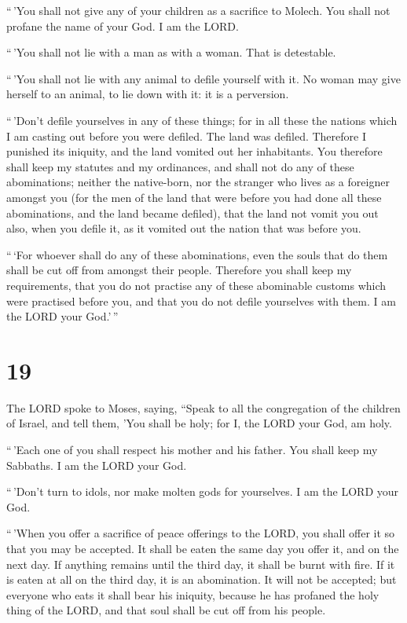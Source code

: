  ``\,'You shall not give any of your children as a
sacrifice to Molech. You shall not profane the name of your God. I am
the LORD.

 ``\,'You shall not lie with a man as with a woman. That is
detestable.

 ``\,'You shall not lie with any animal to defile yourself
with it. No woman may give herself to an animal, to lie down with it: it
is a perversion.

 ``\,'Don't defile yourselves in any of these things; for
in all these the nations which I am casting out before you were defiled.
 The land was defiled. Therefore I punished its iniquity,
and the land vomited out her inhabitants.  You therefore
shall keep my statutes and my ordinances, and shall not do any of these
abominations; neither the native-born, nor the stranger who lives as a
foreigner amongst you  (for the men of the land that were
before you had done all these abominations, and the land became
defiled),  that the land not vomit you out also, when you
defile it, as it vomited out the nation that was before you.

 ``\,`For whoever shall do any of these abominations, even
the souls that do them shall be cut off from amongst their people.
 Therefore you shall keep my requirements, that you do not
practise any of these abominable customs which were practised before
you, and that you do not defile yourselves with them. I am the LORD your
God.'\,''

\hypertarget{section-18}{%
\section{19}\label{section-18}}

 The LORD spoke to Moses, saying,  ``Speak to
all the congregation of the children of Israel, and tell them, 'You
shall be holy; for I, the LORD your God, am holy.

 ``\,'Each one of you shall respect his mother and his
father. You shall keep my Sabbaths. I am the LORD your God.

 ``\,'Don't turn to idols, nor make molten gods for
yourselves. I am the LORD your God.

 ``\,'When you offer a sacrifice of peace offerings to the
LORD, you shall offer it so that you may be accepted.  It
shall be eaten the same day you offer it, and on the next day. If
anything remains until the third day, it shall be burnt with fire.
 If it is eaten at all on the third day, it is an
abomination. It will not be accepted;  but everyone who eats
it shall bear his iniquity, because he has profaned the holy thing of
the LORD, and that soul shall be cut off from his people.

